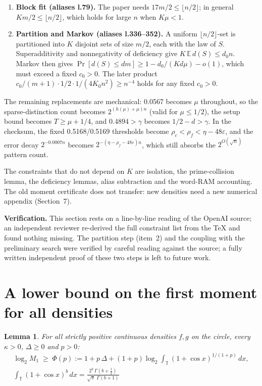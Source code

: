 \documentclass[11pt]{article}
\newcommand{\E}{\mathbb{E}}
\newcommand{\eps}{\varepsilon}
\theoremstyle{plain}
\newtheorem{lemma}{Lemma}
\begin{document}
\begin{enumerate}
\item \textbf{Block fit (aliases l.79).} The paper needs $17 m/2 \le \lfloor n/2 \rfloor$; in general $K m/2 \le \lfloor n/2 \rfloor$, which holds for large $n$ when $K\mu < 1$.
\item \textbf{Partition and Markov (aliases l.336--352).} A uniform $\lfloor n/2 \rfloor$-set is partitioned into $K$ disjoint sets of size $m/2$, each with the law of $S$. Superadditivity and nonnegativity of deficiency give $K\, \E\, d(S) \le d_0 n$. Markov then gives $\Pr[d(S) \le d m] \ge 1 - d_0/(K d \mu) - o(1)$, which must exceed a fixed $c_0 > 0$. The later product $c_0/(m+1) \cdot 1/2 \cdot 1/(4 K_0 n^2) \ge n^{-4}$ holds for any fixed $c_0 > 0$.
\end{enumerate}

The remaining replacements are mechanical: 0.0567 becomes $\mu$ throughout, so the sparse-distinction count becomes $2^{(h(\mu)+\mu)n}$ (valid for $\mu \le 1/2$), the setup bound becomes $T \ge \mu + 1/4$, and $0.4894 > \gamma$ becomes $1/2 - d > \gamma$. In the checksum, the fixed 0.5168/0.5169 thresholds become $\rho_c < \rho_f < \eta - 48\eps$, and the error decay $2^{-0.0007n}$ becomes $2^{-(\eta - \rho_f - 48\eps)n}$, which still absorbs the $2^{O(\sqrt{n})}$ pattern count.

The constraints that do not depend on $K$ are isolation, the prime-collision lemma, the deficiency lemmas, alias subtraction and the word-RAM accounting. The old moment certificate does not transfer: new densities need a new numerical appendix (Section~7).

\textbf{Verification.} This section rests on a line-by-line reading of the OpenAI source; an independent reviewer re-derived the full constraint list from the \TeX{} and found nothing missing. The partition step (item~2) and the coupling with the preliminary search were verified by careful reading against the source; a fully written independent proof of these two steps is left to future work.

\section{A lower bound on the first moment for all densities}

\begin{lemma}
For all strictly positive continuous densities $f, g$ on the circle, every $\kappa > 0$, $\Delta \ge 0$ and $p > 0$:
\begin{gather*}
\log_2 M_1 \;\ge\; \Phi(p) := 1 + p\,\Delta + (1+p)\log_2 \int_{\mathbb T} (1+\cos x)^{1/(1+p)}\,dx, \\ \int_{\mathbb T} (1+\cos x)^b\,dx = \frac{2^b\,\Gamma(b+\tfrac12)}{\sqrt{\pi}\;\Gamma(b+1)}
\end{gather*}
\end{lemma}
\end{document}
